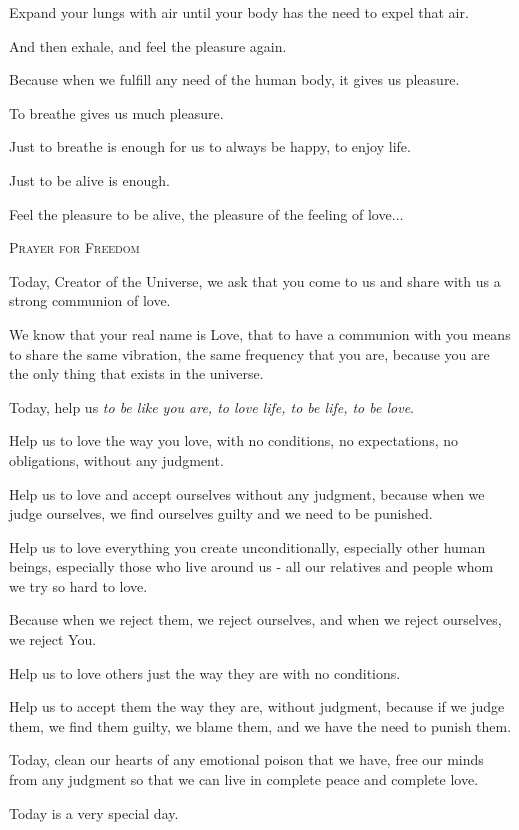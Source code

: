 \documentclass{article}
\numberwithin{equation}{section}
\begin{document}
Expand your lungs with air until your body has the need to expel that air.

And then exhale, and feel the pleasure again.

Because when we fulfill any need of the human body, it gives us pleasure.

To breathe gives us much pleasure.

Just to breathe is enough for us to always be happy, to enjoy life.

Just to be alive is enough.

Feel the pleasure to be alive, the pleasure of the feeling of love$\ldots$
\begin{center}
    \textsc{Prayer for Freedom}
\end{center}

Today, Creator of the Universe, we ask that you come to us and share with us a strong communion of love.

We know that your real name is Love, that to have a communion with you means to share the same vibration, the same frequency that you are, because you are the only thing that exists in the universe.

%
Today, help us \textit{to be like you are, to love life, to be life, to be love}.

Help us to love the way you love, with no conditions, no expectations, no obligations, without any judgment.

Help us to love and accept ourselves without any judgment, because when we judge ourselves, we find ourselves guilty and we need to be punished.

%
Help us to love everything you create unconditionally, especially other human beings, especially those who live around us - all our relatives and people whom we try so hard to love.

Because when we reject them, we reject ourselves, and when we reject ourselves, we reject You.

%
Help us to love others just the way they are with no conditions.

Help us to accept them the way they are, without judgment, because if we judge them, we find them guilty, we blame them, and we have the need to punish them.

%
Today, clean our hearts of any emotional poison that we have, free our minds from any judgment so that we can live in complete peace and complete love.

%
Today is a very special day.
\end{document}
